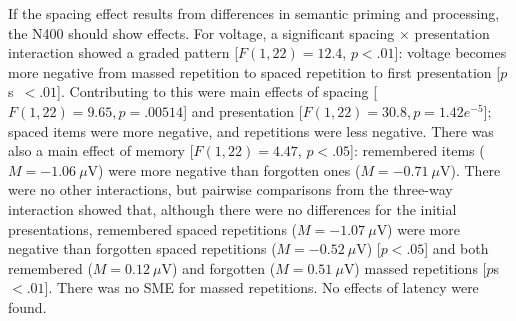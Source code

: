 If the spacing effect results from differences in semantic priming and processing, the N400 should show effects.
For voltage, a significant spacing $\times$ presentation interaction showed a graded pattern [$F(1,22)=12.4$, $p<.01$]: voltage becomes more negative from massed repetition to spaced repetition to first presentation [$p$s~$<.01$].  Contributing to this were main effects of spacing [$F(1,22)=9.65, p=.00514$] and presentation [$F(1,22)=30.8, p=1.42e^{-5}$]; spaced items were more negative, and repetitions were less negative.  There was also a main effect of memory [$F(1,22)=4.47$, $p<.05$]: remembered items ($M=-1.06~\mu$V) were more negative than forgotten ones ($M=-0.71~\mu$V).
There were no other interactions, but pairwise comparisons from the three-way interaction showed that, although there were no differences for the initial presentations, remembered spaced repetitions ($M=-1.07~\mu$V) were more negative than forgotten spaced repetitions ($M=-0.52~\mu$V) [$p<.05$] and both remembered ($M=0.12~\mu$V) and forgotten ($M=0.51~\mu$V) massed repetitions [$p$s~$<.01$].  There was no SME for massed repetitions.
No effects of latency were found.


